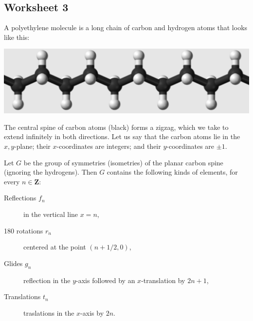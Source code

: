 \documentclass[11pt]{article}
\begin{document}
\subsection{Worksheet 3}
\label{sec:org57b16ab}
A polyethylene molecule is a long chain of carbon and hydrogen atoms that looks like this:

\begin{center}
\includegraphics[scale=0.2]{assets/Workshops/2022-08-11_12-18-09_screenshot.png}
\end{center}

The central spine of carbon atoms (black) forms a zigzag, which we take to extend infinitely in both directions.
Let us say that the carbon atoms lie in the \(x,y\)-plane; their \(x\)-coordinates are integers; and their \(y\)-coordinates are \(\pm 1\).

Let \(G\) be the group of symmetries (isometries) of the planar carbon spine (ignoring the hydrogens).
Then \(G\) contains the following kinds of elements, for every \(n \in \mathbf{Z}\):
\begin{description}
\item[{Reflections \(f_{n}\)}] in the vertical line \(x = n\),
\item[{180 rotations \(r_{n}\)}] centered at the point \((n + 1/2, 0)\),
\item[{Glides \(g_{n}\)}] reflection in the \(y\)-axis followed by an \(x\)-translation by \(2n+1\),
\item[{Translations \(t_{n}\)}] traslations in the \(x\)-axis by \(2n\).
\end{description}
\end{document}
